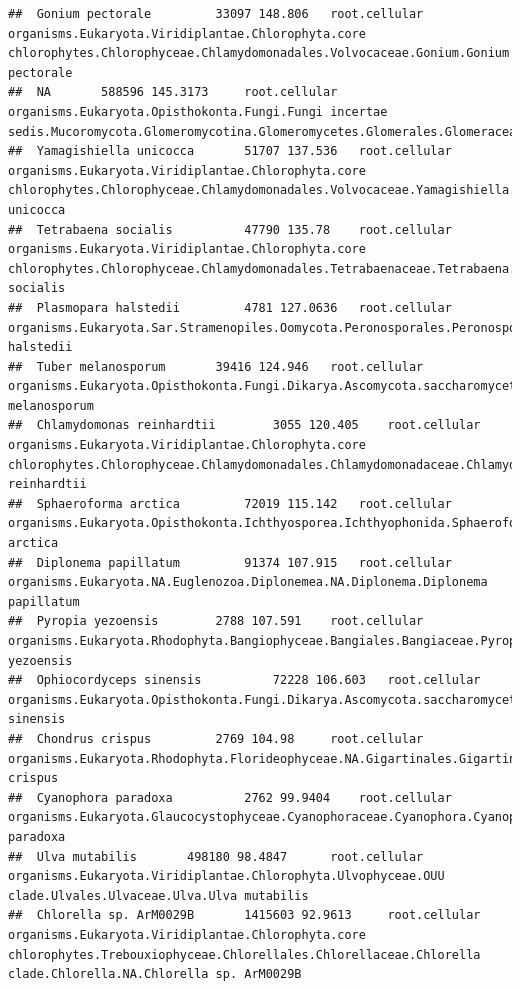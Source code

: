 \documentclass{article}\usepackage[]{graphicx}\usepackage[]{color}
\makeatletter
\newenvironment{kframe}{%
 \def\at@end@of@kframe{}%
 \ifinner\ifhmode%
  \def\at@end@of@kframe{\end{minipage}}%
  \begin{minipage}{\columnwidth}%
 \fi\fi%
 \def\FrameCommand##1{\hskip\@totalleftmargin \hskip-\fboxsep
 \colorbox{shadecolor}{##1}\hskip-\fboxsep
     \hskip-\linewidth \hskip-\@totalleftmargin \hskip\columnwidth}%
 \MakeFramed {\advance\hsize-\width
   \@totalleftmargin\z@ \linewidth\hsize
   \@setminipage}}%
 {\par\unskip\endMakeFramed%
 \at@end@of@kframe}
\newenvironment{knitrout}{}{} %
\makeatother
\begin{document}
\begin{knitrout}
\begin{kframe}
\begin{verbatim}
##  Gonium pectorale 		 33097 148.806 	 root.cellular organisms.Eukaryota.Viridiplantae.Chlorophyta.core chlorophytes.Chlorophyceae.Chlamydomonadales.Volvocaceae.Gonium.Gonium pectorale
##  NA 		 588596 145.3173 	 root.cellular organisms.Eukaryota.Opisthokonta.Fungi.Fungi incertae sedis.Mucoromycota.Glomeromycotina.Glomeromycetes.Glomerales.Glomeraceae.Rhizophagus.NA
##  Yamagishiella unicocca 		 51707 137.536 	 root.cellular organisms.Eukaryota.Viridiplantae.Chlorophyta.core chlorophytes.Chlorophyceae.Chlamydomonadales.Volvocaceae.Yamagishiella.Yamagishiella unicocca
##  Tetrabaena socialis 		 47790 135.78 	 root.cellular organisms.Eukaryota.Viridiplantae.Chlorophyta.core chlorophytes.Chlorophyceae.Chlamydomonadales.Tetrabaenaceae.Tetrabaena.Tetrabaena socialis
##  Plasmopara halstedii 		 4781 127.0636 	 root.cellular organisms.Eukaryota.Sar.Stramenopiles.Oomycota.Peronosporales.Peronosporaceae.Plasmopara.Plasmopara halstedii
##  Tuber melanosporum 		 39416 124.946 	 root.cellular organisms.Eukaryota.Opisthokonta.Fungi.Dikarya.Ascomycota.saccharomyceta.Pezizomycotina.Pezizomycetes.Pezizales.Tuberaceae.Tuber.Tuber melanosporum
##  Chlamydomonas reinhardtii 		 3055 120.405 	 root.cellular organisms.Eukaryota.Viridiplantae.Chlorophyta.core chlorophytes.Chlorophyceae.Chlamydomonadales.Chlamydomonadaceae.Chlamydomonas.Chlamydomonas reinhardtii
##  Sphaeroforma arctica 		 72019 115.142 	 root.cellular organisms.Eukaryota.Opisthokonta.Ichthyosporea.Ichthyophonida.Sphaeroforma.Sphaeroforma arctica
##  Diplonema papillatum 		 91374 107.915 	 root.cellular organisms.Eukaryota.NA.Euglenozoa.Diplonemea.NA.Diplonema.Diplonema papillatum
##  Pyropia yezoensis 		 2788 107.591 	 root.cellular organisms.Eukaryota.Rhodophyta.Bangiophyceae.Bangiales.Bangiaceae.Pyropia.Pyropia yezoensis
##  Ophiocordyceps sinensis 		 72228 106.603 	 root.cellular organisms.Eukaryota.Opisthokonta.Fungi.Dikarya.Ascomycota.saccharomyceta.Pezizomycotina.leotiomyceta.sordariomyceta.Sordariomycetes.Hypocreomycetidae.Hypocreales.Ophiocordycipitaceae.Ophiocordyceps.Ophiocordyceps sinensis
##  Chondrus crispus 		 2769 104.98 	 root.cellular organisms.Eukaryota.Rhodophyta.Florideophyceae.NA.Gigartinales.Gigartinaceae.Chondrus.Chondrus crispus
##  Cyanophora paradoxa 		 2762 99.9404 	 root.cellular organisms.Eukaryota.Glaucocystophyceae.Cyanophoraceae.Cyanophora.Cyanophora paradoxa
##  Ulva mutabilis 		 498180 98.4847 	 root.cellular organisms.Eukaryota.Viridiplantae.Chlorophyta.Ulvophyceae.OUU clade.Ulvales.Ulvaceae.Ulva.Ulva mutabilis
##  Chlorella sp. ArM0029B 		 1415603 92.9613 	 root.cellular organisms.Eukaryota.Viridiplantae.Chlorophyta.core chlorophytes.Trebouxiophyceae.Chlorellales.Chlorellaceae.Chlorella clade.Chlorella.NA.Chlorella sp. ArM0029B

\end{verbatim}
\end{kframe}
\end{knitrout}
\end{document}
